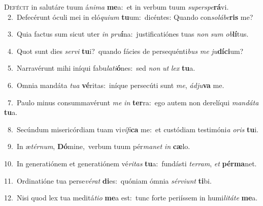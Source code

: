 \lettrine{\initial\textcolor{\initialcolor}{D}}{efécit} in salutáre tuum á\-\textit{ni}\-\textit{ma} \textbf{me}\-a:~\star et in verbum tuum \textit{su}\-\textit{per}\textit{spe}\textbf{rá}vi.\\
{\numbfont\textcolor{\numbcolor}{~2.}}~Defecérunt óculi mei in eló\-\textit{qui}\-\textit{um} \textbf{tu}\-um:~\star dicéntes: Quando con\-\textit{so}\-\textit{lá}\textit{be}\textbf{ris} me?\par
{\numbfont\textcolor{\numbcolor}{~3.}}~Quia factus sum sicut uter \textit{in} \textit{pru}\-\textbf{í}na:~\star justificatiónes tuas \textit{non} \textit{sum} \textit{ob}\-\textbf{lí}tus.\par
{\numbfont\textcolor{\numbcolor}{~4.}}~Quot sunt dies \textit{ser}\-\textit{vi} \textbf{tu}\-i?~\star quando fácies de persequénti\textit{bus} \textit{me} \textit{ju}\-\textbf{dí}\textbf{ci}um?\par
{\numbfont\textcolor{\numbcolor}{~5.}}~Narravérunt mihi iníqui fabu\-\textit{la}\-\textit{ti}\textbf{ó}nes:~\star sed \textit{non} \textit{ut} \textit{lex} \textbf{tu}\-a.\par
{\numbfont\textcolor{\numbcolor}{~6.}}~Omnia mandáta \textit{tu}\-\textit{a} \textbf{vé}\-ritas:~\star iníque persecúti sunt \textit{me}\-, \textit{ád}\-\textit{ju}\textbf{va} me.\par
{\numbfont\textcolor{\numbcolor}{~7.}}~Paulo minus consummavérunt \textit{me} \textit{in} \textbf{ter}\-ra:~\star ego autem non derelíqui \textit{man}\-\textit{dá}\textit{ta} \textbf{tu}\-a.\par
{\numbfont\textcolor{\numbcolor}{~8.}}~Secúndum misericórdiam tuam vi\-\textit{ví}\-\textit{fi}\textbf{ca} me:~\star et custódiam testimóni\textit{a} \textit{o}\-\textit{ris} \textbf{tu}\-i.\par
{\numbfont\textcolor{\numbcolor}{~9.}}~In æ\-\textit{tér}\-\textit{num}, \textbf{Dó}\-mine,~\star verbum tuum pér\-\textit{ma}\-\textit{net} \textit{in} \textbf{cæ}\-lo.\par
{\numbfont\textcolor{\numbcolor}{10.}}~In generatiónem et generatiónem vé\-\textit{ri}\-\textit{tas} \textbf{tu}\-a:~\star fundásti \textit{ter}\-\textit{ram}, \textit{et} \textbf{pér}\-\textbf{ma}net.\par
{\numbfont\textcolor{\numbcolor}{11.}}~Ordinatióne tua perse\-\textit{vé}\-\textit{rat} \textbf{di}\-es:~\star quóniam ómnia \textit{sér}\-\textit{vi}\textit{unt} \textbf{ti}\-bi.\par
{\numbfont\textcolor{\numbcolor}{12.}}~Nisi quod lex tua meditá\-\textit{ti}\-\textit{o} \textbf{me}\-a est:~\star tunc forte periíssem in humi\-\textit{li}\-\textit{tá}\textit{te} \textbf{me}\-a.\par
